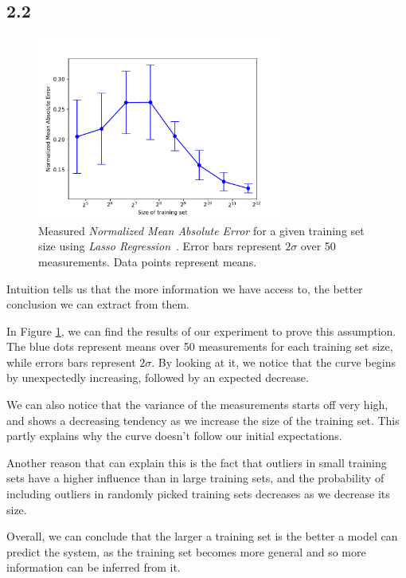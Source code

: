 \documentclass[10pt]{article}
\begin{document}
\subsection*{2.2}
\label{sec:6}

\begin{figure}[h!]
    \centering
    \captionsetup{justification=centering}
    \includegraphics[width=0.72\textwidth,height=\textheight,keepaspectratio]{../result/project1/training_set_size_errors.pdf}
    \caption{Measured \textit{Normalized Mean Absolute Error} for a given training set size using \textit{Lasso Regression}~\cite{Lasso}. Error bars represent $2\sigma$ over 50 measurements. Data points represent means.}
    \label{fig:5}
\end{figure}

Intuition tells us that the more information we have access to, the better conclusion we can extract from them.

In Figure \ref{fig:5}, we can find the results of our experiment to prove this assumption. The blue dots represent means over 50 measurements for each training set size, while errors bars represent $2\sigma$. By looking at it, we notice that the curve begins by unexpectedly increasing, followed by an expected decrease. 

We can also notice that the variance of the measurements starts off very high, and shows a decreasing tendency as we increase the size of the training set. This partly explains why the curve doesn't follow our initial expectations. 

Another reason that can explain this is the fact that outliers in small training sets have a higher influence than in large training sets, and the probability of including outliers in randomly picked training sets decreases as we decrease its size.

Overall, we can conclude that the larger a training set is the better a model can predict the system, as the training set becomes more general and so more information can be inferred from it.
\end{document}
